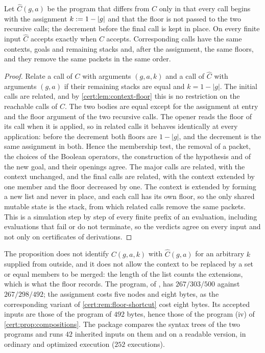 \begin{proposition}\label{cert:prop:context-floor}
Let $\widehat C(g,a)$ be the program that differs from $C$ only in that every
call begins with the assignment $k\mathrel{:=} 1-\lvert g\rvert$ and that the floor
is not passed to the two recursive calls; the decrement before the final call
is kept in place. On every finite input $\widehat C$ accepts exactly when $C$
accepts. Corresponding calls have the same contexts, goals and remaining
stacks and, after the assignment, the same floors, and they remove the same
packets in the same order.
\end{proposition}
\begin{proof}
Relate a call of $C$ with arguments $(g,a,k)$ and a call of $\widehat C$ with
arguments $(g,a)$ if their remaining stacks are equal and
$k=1-\lvert g\rvert$. The initial calls are related, and by
\cref{cert:lem:context-floor} this is no restriction on the reachable calls
of $C$. The two bodies are equal except for the assignment at entry and the
floor argument of the two recursive calls. The opener reads the floor of its
call when it is applied, so in related calls it behaves identically at every
application: before the decrement both floors are $1-\lvert g\rvert$, and the
decrement is the same assignment in both. Hence the membership test, the
removal of a packet, the choices of the Boolean operators, the construction
of the hypothesis and of the new goal, and their openings agree. The major
calls are related, with the context unchanged, and the final calls are
related, with the context extended by one member and the floor decreased by
one. The context is extended by forming a new list and never in place, and
each call has its own floor, so the only shared mutable state is the stack,
from which related calls remove the same packets. This is a simulation step
by step of every finite prefix of an evaluation, including evaluations that
fail or do not terminate, so the verdicts agree on every input and not only
on certificates of derivations.
\end{proof}

The proposition does not identify $C(g,a,k)$ with $\widehat C(g,a)$ for an
arbitrary $k$ supplied from outside, and it does not allow the context to be
replaced by a set or equal members to be merged: the length of the list
counts the extensions, which is what the floor records. The program, of
, has $267/303/500$ against $267/298/492$; the
assignment costs five nodes and eight bytes, as the corresponding variant of
\cref{cert:rem:floor-shortcut} cost eight bytes. Its accepted inputs are
those of the program of $492$ bytes, hence those of the program (iv) of
\cref{cert:prop:compositions}. The package compares the syntax trees of the
two programs and runs $42$ inherited inputs on them and on a readable
version, in ordinary and optimized execution ($252$ executions).

